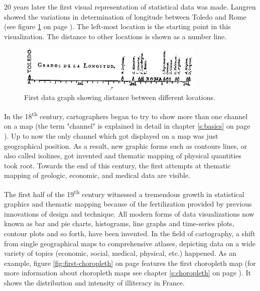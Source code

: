 20 years later the first visual representation of statistical data was made. Langren showed the variations in determination of longitude between Toledo and Rome (see figure \ref{fig:langren} on page \pageref{fig:langren}). The left-most location is the starting point in this visualization. The distance to other locations is shown as a number line.

\begin{figure}[!htb]
\centering
\includegraphics[width=0.8\textwidth,keepaspectratio]{images/history/langren.jpg}
\caption[
    First data graph showing variations in determination of longitude between Toledo and Rome, Urldate: 07.2016 \newline
\small\texttt{\url{http://datavis.ca/milestones//admin/uploads/images/tufte/langren.jpg}}
]{First data graph showing distance between different locations.}
\label{fig:langren}
\end{figure}

In the 18\textsuperscript{th} century, cartographers began to try to show more than one channel on a map (the term "channel" is explained in detail in chapter \ref{s:basics} on page \pageref{s:basics}). Up to now the only channel which got displayed on a map was just geographical position. As a result, new graphic forms such as contours lines, or also called isolines, got invented and thematic mapping of physical quantities took root. Towards the end of this century, the first attempts at thematic mapping of geologic, economic, and medical data are visible.

The first half of the 19\textsuperscript{th} century witnessed a tremendous growth in statistical graphics and thematic mapping because of the fertilization provided by previous innovations of design and technique. All modern forms of data visualizations now known as bar and pie charts, histograms, line graphs and time-series plots, contour plots and so forth, have been invented. In the field of cartography, a shift from single geographical maps to comprehensive atlases, depicting data on a wide variety of topics (economic, social, medical, physical, etc.) happened. As an example, figure \ref{fig:first-choropleth} on page \pageref{fig:first-choropleth} features the first choropleth map (for more information about choropleth maps see chapter \ref{s:choropleth} on page \pageref{s:choropleth}). It shows the distribution and intensity of illiteracy in France.

